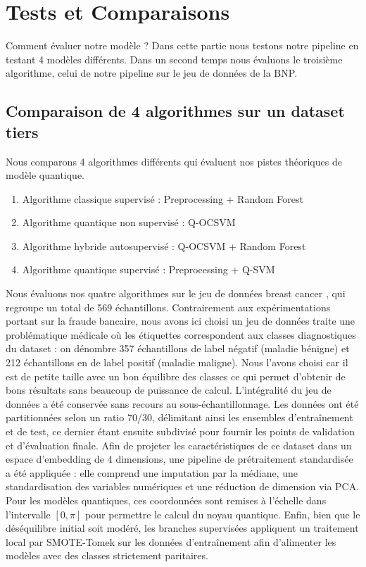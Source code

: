 \documentclass[a4paper]{article}
\begin{document}
\section{Tests et Comparaisons}

Comment évaluer notre modèle ? Dans cette partie nous testons notre pipeline en testant 4 modèles différents. Dans un second temps nous évaluons le troisième algorithme, celui de notre pipeline sur le jeu de données de la BNP. 

\subsection{Comparaison de 4 algorithmes sur un dataset tiers}

Nous comparons 4 algorithmes différents qui évaluent nos pistes théoriques de modèle quantique. 

\begin{enumerate}
    \item Algorithme classique supervisé : Preprocessing + Random Forest
    \item Algorithme quantique non supervisé : Q-OCSVM
    \item Algorithme hybride autosupervisé : Q-OCSVM + Random Forest 
    \item Algorithme quantique supervisé : Preprocessing + Q-SVM
\end{enumerate}



Nous évaluons nos quatre algorithmes sur le jeu de données breast cancer \cite{street1993nuclear}, qui regroupe un total de 569 échantillons. Contrairement aux expérimentations portant sur la fraude bancaire, nous avons ici choisi un jeu de données traite une problématique médicale où les étiquettes correspondent aux classes diagnostiques du dataset : on dénombre 357 échantillons de label négatif (maladie bénigne) et 212 échantillons en de label positif (maladie maligne). Nous l'avons choisi car il est de petite taille avec un bon équilibre des classes ce qui permet d'obtenir de bons résultats sans beaucoup de puissance de calcul. L'intégralité du jeu de données a été conservée sans recours au sous-échantillonnage. Les données ont été partitionnées selon un ratio 70/30, délimitant ainsi les ensembles d'entraînement et de test, ce dernier étant ensuite subdivisé pour fournir les points de validation et d'évaluation finale. Afin de projeter les caractéristiques de ce dataset dans un espace d'embedding de 4 dimensions, une pipeline de prétraitement standardisée a été appliquée : elle comprend une imputation par la médiane, une standardisation des variables numériques et une réduction de dimension via PCA. Pour les modèles quantiques, ces coordonnées sont remises à l'échelle dans l'intervalle $[0, \pi]$ pour permettre le calcul du noyau quantique. Enfin, bien que le déséquilibre initial soit modéré, les branches supervisées appliquent un traitement local par SMOTE-Tomek sur les données d'entraînement afin d'alimenter les modèles avec des classes strictement paritaires.
\end{document}
